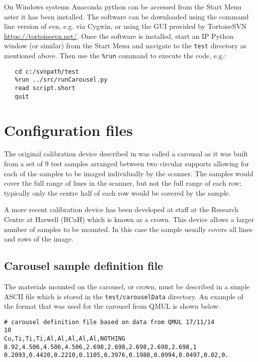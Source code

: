 \documentclass[a4paper]{article}
\begin{document}
On Windows systems Anaconda python can be accessed from the Start Menu aster it has been installed.
The software can be downloaded using the command line version of svn, e.g. via Cygwin, or using the GUI
provided by TortoiseSVN \url{https://tortoisesvn.net/}.
Once the software is installed, start an IP Python window (or similar) from the Start Menu and navigate to the 
\texttt{test} directory as mentioned above. Then use the \texttt{\%run} command to execute the code, e.g.:
\begin{verbatim}
   cd c:/svnpath/test
   %run ../src/runCarousel.py
   read script.short
   quit
\end{verbatim}

\section{Configuration files}

The original calibration device described in \cite{davis} was called a carousal as it was built from a set of 9 test samples
arranged between two circular supports allowing for each of the samples to be imaged individually by the scanner.
The samples would cover the full range of lines in the scanner, but not the full range of each row; typically only
the centre half of each row would be covered by the sample.

A more recent calibration device has been developed at staff at the Research Centre at Harwell (RCaH) which is
known as a crown. This device allows a larger number of samples to be mounted.
In this case the sample usually covers all lines and rows of the image.

\subsection{Carousel sample definition file}

The materials mounted on the carousel, or crown, must be described in a simple ASCII file which is stored
in the \texttt{test/carouselData} directory.
An example of the format that was used for the carousel from QMUL is shown below.
\begin{verbatim}
# carousel definition file based on data from QMUL 17/11/14
10
Cu,Ti,Ti,Ti,Al,Al,Al,Al,Al,NOTHING
8.92,4.506,4.506,4.506,2.698,2.698,2.698,2.698,2.698,1
0.2093,0.4420,0.2210,0.1105,0.3976,0.1988,0.0994,0.0497,0.02,0.
\end{verbatim}
\end{document}
